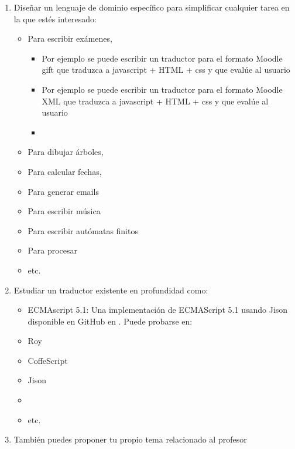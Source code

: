 \begin{enumerate}
\item
Diseñar un lenguaje de dominio específico para simplificar cualquier tarea en la que estés interesado:

\begin{itemize}
\item
Para escribir exámenes, 
\begin{itemize}
\item Por ejemplo se puede escribir un traductor para el formato Moodle gift que traduzca a javascript + HTML + css y que evalúe al usuario
\item Por ejemplo se puede escribir un traductor para el formato Moodle XML que traduzca a javascript + HTML + css y que evalúe al usuario
\item
\end{itemize}
\item
Para dibujar árboles, 
\item
Para calcular fechas,
\item
Para generar emails
\item
Para escribir música
\item
Para escribir autómatas finitos
\item 
Para procesar 
\item
etc.
\end{itemize}
\item
Estudiar un traductor existente en profundidad  como:
\begin{itemize}
\item 
ECMAscript 5.1: 
 Una implementación de ECMAScript 5.1 usando Jison 
disponible 
en GitHub
 en
.
Puede probarse en:
\item Roy
\item CoffeScript
\item Jison
\item 
{}
\item etc.
\end{itemize}
\item
También puedes proponer tu propio tema relacionado al profesor
\end{enumerate}

